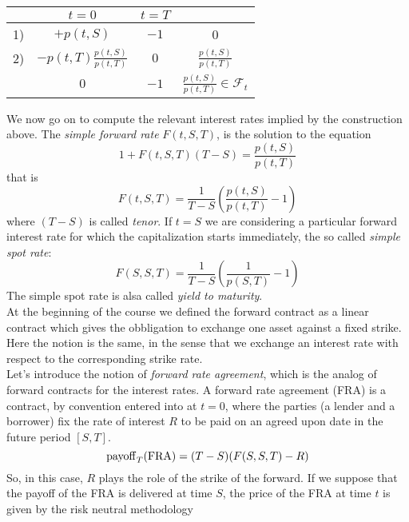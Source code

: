 \begin{center}
    \begin{tabular}{lccc}
        \toprule
           & $t=0$ & $t=T$ \\\midrule
        1) & $+p(t,S)$ & $-1$ & 0 \\
        2) & $-p(t,T)\tfrac{p(t,S)}{p(t,T)}$ & $0$ & $\tfrac{p(t,S)}{p(t,T)}$ \\
        \midrule\midrule
           & $0$ & $-1$ & $\tfrac{p(t,S)}{p(t,T)}\in\mathcal{F}_t$ \\\bottomrule
    \end{tabular}
\end{center}
We now go on to compute the relevant interest rates implied by the construction above. The \emph{simple forward rate} $F(t,S,T)$, is the solution to the equation
\begin{equation}
    1 + F(t,S,T)(T-S) = \frac{p(t,S)}{p(t,T)}
\end{equation}
that is
\begin{equation}
    F(t,S,T) = \frac{1}{T-S}\left(\frac{p(t,S)}{p(t,T)}-1\right)
\end{equation}
where $(T-S)$ is called \emph{tenor}. If $t=S$ we are considering a particular forward interest rate for which the capitalization starts immediately, the so called \emph{simple spot rate}:
\begin{equation}
    F(S,S,T) = \frac{1}{T-S}\left(\frac{1}{p(S,T)}-1\right)
\end{equation}
The simple spot rate is alsa called \emph{yield to maturity}.\\
At the beginning of the course we defined the forward contract as a linear contract which gives the obbligation to exchange one asset against a fixed strike. Here the notion is the same, in the sense that we exchange an interest rate with respect to the corresponding strike rate.\\
Let's introduce the notion of \emph{forward rate agreement}, which is the analog of forward contracts for the interest rates. A forward rate agreement (FRA) is a contract, by convention entered into at $t = 0$, where the parties (a lender and a borrower) fix the rate of interest $R$ to be paid on an agreed upon date in the future period $[S,T]$.
\begin{equation}
    \operatorname{payoff}_T(\text{FRA}) = (T-S)(F(S,S,T)-R)
\end{equation}
So, in this case, $R$ plays the role of the strike of the forward. If we suppose that the payoff of the FRA is delivered at time $S$, the price of the FRA at time $t$ is given by the risk neutral methodology
